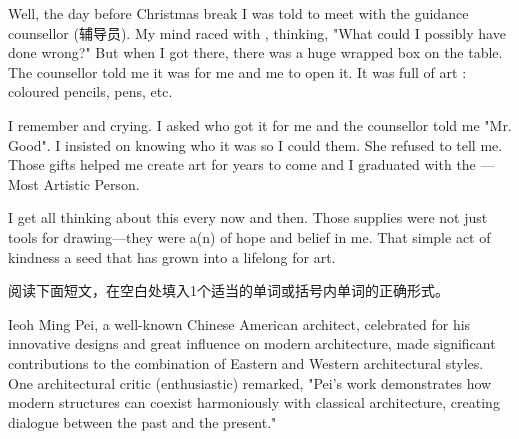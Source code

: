 \documentclass{英语试卷}
\begin{document}
\par Well, the day before Christmas break I was told to meet with the guidance counsellor (辅导员). My mind raced with , thinking, "What could I possibly have done wrong?" But when I got there, there was a huge wrapped box on the table. The counsellor told me it was for me and  me to open it. It was full of art : coloured pencils, pens, etc.\par
\par I remember  and crying. I asked who got it for me and the counsellor told me "Mr. Good". I insisted on knowing who it was so I could  them. She refused to tell me. Those gifts helped me create art for years to come and I graduated with the  — Most Artistic Person.\par
\par I get all  thinking about this every now and then. Those supplies were not just tools for drawing—they were a(n)  of hope and belief in me. That simple act of kindness  a seed that has grown into a lifelong  for art.\par
{}
\par 阅读下面短文，在空白处填入1个适当的单词或括号内单词的正确形式。\par
\par Ieoh Ming Pei, a well-known Chinese American architect, celebrated for his innovative designs and great influence on modern architecture, made significant contributions to the combination of Eastern and Western architectural styles. One architectural critic  (enthusiastic) remarked, "Pei's work demonstrates how modern structures can coexist harmoniously with classical architecture, creating  dialogue between the past and the present."\par
\end{document}
